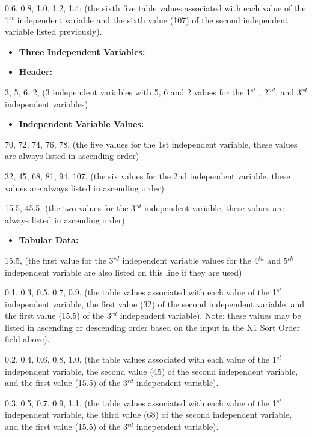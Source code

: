0.6, 0.8, 1.0, 1.2, 1.4; (the sixth five table values associated with each value of the 1\(^{st}\) independent variable and the sixth value (107) of the second independent variable listed previously).

\begin{itemize}
\item
  \textbf{Three Independent Variables:}
\item
  \textbf{Header:}
\end{itemize}

3, 5, 6, 2, (3 independent variables with 5, 6 and 2 values for the 1\(^{st}\) , 2\(^{nd}\), and 3\(^{rd}\) independent variables)

\begin{itemize}
\tightlist
\item
  \textbf{Independent Variable Values:}
\end{itemize}

70, 72, 74, 76, 78, (the five values for the 1st independent variable, these values are always listed in ascending order)

32, 45, 68, 81, 94, 107, (the six values for the 2nd independent variable, these values are always listed in ascending order)

15.5, 45.5, (the two values for the 3\(^{rd}\) independent variable, these values are always listed in ascending order)

\begin{itemize}
\tightlist
\item
  \textbf{Tabular Data:}
\end{itemize}

15.5, (the first value for the 3\(^{rd}\) independent variable values for the 4\(^{th}\) and 5\(^{th}\) independent variable are also listed on this line if they are used)

0.1, 0.3, 0.5, 0.7, 0.9, (the table values associated with each value of the 1\(^{st}\) independent variable, the first value (32) of the second independent variable, and the first value (15.5) of the 3\(^{rd}\) independent variable). Note: these values may be listed in ascending or descending order based on the input in the X1 Sort Order field above).

0.2, 0.4, 0.6, 0.8, 1.0, (the table values associated with each value of the 1\(^{st}\) independent variable, the second value (45) of the second independent variable, and the first value (15.5) of the 3\(^{rd}\) independent variable).

0.3, 0.5, 0.7, 0.9, 1.1, (the table values associated with each value of the 1\(^{st}\) independent variable, the third value (68) of the second independent variable, and the first value (15.5) of the 3\(^{rd}\) independent variable).


